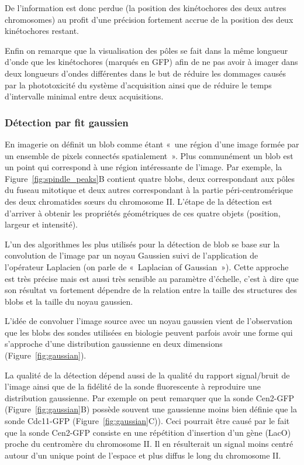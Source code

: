 \documentclass[12pt,a4paper,twoside,openright]{book}
\begin{document}
De l'information est donc perdue (la position des kinétochores des deux
autres chromosomes) au profit d'une précision fortement accrue de la
position des deux kinétochores restant.

Enfin on remarque que la visualisation des pôles se fait dans la même
longueur d'onde que les kinétochores (marqués en GFP) afin de ne pas
avoir à imager dans deux longueurs d'ondes différentes dans le but de
réduire les dommages causés par la phototoxicité du système
d'acquisition ainsi que de réduire le temps d'intervalle minimal entre
deux acquisitions.

\subsubsection{Détection par fit
gaussien}\label{duxe9tection-par-fit-gaussien}

En imagerie on définit un blob comme étant «~une région d'une image
formée par un ensemble de pixels connectés spatialement~». Plus
communément un blob est un point qui correspond à une région
intéressante de l'image. Par exemple, la Figure~\ref{fig:spindle_peaks}B
contient quatre blobs, deux correspondant aux pôles du fuseau mitotique
et deux autres correspondant à la partie péri-centromérique des deux
chromatides sœurs du chromosome II. L'étape de la détection est
d'arriver à obtenir les propriétés géométriques de ces quatre objets
(position, largeur et intensité).

L'un des algorithmes les plus utilisés pour la détection de blob se base
sur la convolution de l'image par un noyau Gaussien suivi de
l'application de l'opérateur Laplacien (on parle de «~Laplacian of
Gaussian~»). Cette approche est très précise mais est aussi très
sensible au paramètre d'échelle, c'est à dire que son résultat va
fortement dépendre de la relation entre la taille des structures des
blobs et la taille du noyau gaussien.

L'idée de convoluer l'image source avec un noyau gaussien vient de
l'observation que les blobs des sondes utilisées en biologie peuvent
parfois avoir une forme qui s'approche d'une distribution gaussienne en
deux dimensions (Figure~\ref{fig:gaussian}).

La qualité de la détection dépend aussi de la qualité du rapport
signal/bruit de l'image ainsi que de la fidélité de la sonde
fluorescente à reproduire une distribution gaussienne. Par exemple on
peut remarquer que la sonde Cen2-GFP (Figure~\ref{fig:gaussian}B)
possède souvent une gaussienne moins bien définie que la sonde Cdc11-GFP
(Figure~\ref{fig:gaussian}C)). Ceci pourrait être causé par le fait que
la sonde Cen2-GFP consiste en une répétition d'insertion d'un gène
(LacO) proche du centromère du chromosome II. Il en résulterait un
signal moins centré autour d'un unique point de l'espace et plus diffus
le long du chromosome II.
\end{document}
